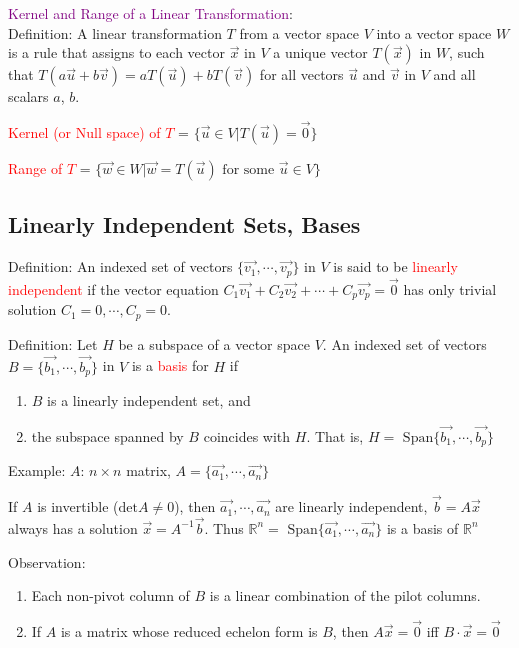 \documentclass[12pt]{article}
\begin{document}
\textcolor{purple}{Kernel and Range of a Linear Transformation}:
\\
Definition: A linear transformation $T$ from a vector space $V$ into a vector space $W$ is a rule that assigns to each vector $\vec{x}$ in $V$ a unique vector $T(\vec{x})$ in $W$, such that $T(a\vec{u} + b\vec{v}) = aT(\vec{u}) + bT(\vec{v})$ for all vectors $\vec{u}$ and $\vec{v}$ in $V$ and all scalars $a$, $b$.

\textcolor{red}{Kernel (or Null space) of $T$} = $\{\vec{u}\in V | T(\vec{u}) = \vec{0}\}$

\textcolor{red}{Range of $T$} = $\{\vec{w}\in W | \vec{w} = T(\vec{u}) \text{ for some }\vec{u}\in V\}$


\subsection{Linearly Independent Sets, Bases}
Definition: An indexed set of vectors $\{\vec{v_1}, \cdots, \vec{v_p}\}$ in $V$ is said to be \textcolor{red}{linearly independent} if the vector equation $C_1 \vec{v_1} + C_2 \vec{v_2} + \cdots + C_p \vec{v_p} = \vec{0}$ has only trivial solution $C_1 = 0, \cdots , C_p = 0$.

Definition: Let $H$ be a subspace of a vector space $V$. An indexed set of vectors $B = \{\vec{b_1}, \cdots, \vec{b_p}\}$ in $V$ is a \textcolor{red}{basis} for $H$ if 
\begin{enumerate}
    \item $B$ is a linearly independent set, and
    \item the subspace spanned by $B$ coincides with $H$. That is, $H =\text{ Span}\{\vec{b_1}, \cdots, \vec{b_p}\}$
\end{enumerate}

Example: $A$: $n\times n$ matrix, $A = \{\vec{a_1}, \cdots, \vec{a_n}\}$

If $A$ is invertible ($\text{det}A \neq 0$), then $\vec{a_1}, \cdots, \vec{a_n}$ are linearly independent, $\vec{b} = A\vec{x}$ always has a solution $\vec{x} = A^{-1}\vec{b}$. Thus $\mathbb{R}^n =\text{ Span}\{\vec{a_1}, \cdots, \vec{a_n}\}$  is a basis of $\mathbb{R}^n$

Observation:
\begin{enumerate}
    \item Each non-pivot column of $B$ is a linear combination of the pilot columns. 
    \item If $A$ is a matrix whose reduced echelon form is $B$, then $A\vec{x} = \vec{0}$ iff $B\cdot \vec{x} = \vec{0}$
\end{enumerate}
\end{document}
